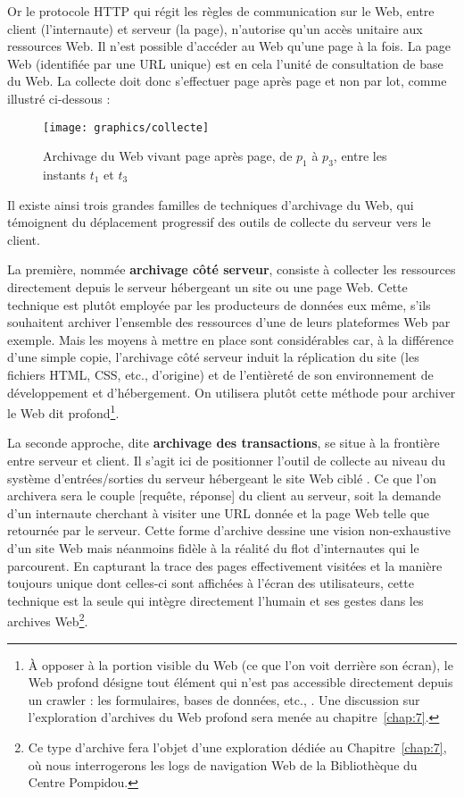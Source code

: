 \documentclass[symmetric,justified,marginals=raggedouter]{tufte-book}
\begin{document}
Or le protocole HTTP qui régit les règles de communication sur le Web, entre client (l'internaute) et serveur (la page), n'autorise qu'un accès unitaire aux ressources Web. Il n'est possible d'accéder au Web qu'une page à la fois. La page Web (identifiée par une URL unique) est en cela l'unité de consultation de base du Web. La collecte doit donc s'effectuer page après page et non par lot, comme illustré ci-dessous :   

\begin{figure*}%
  \texttt{[image: graphics/collecte]}
  \caption{Archivage du Web vivant page après page, de $p_1$ à $p_3$, entre les instants $t_1$ et $t_3$}
  \label{fig:collecte}
\end{figure*} 

\noindent Il existe ainsi trois grandes familles de techniques d'archivage du Web, qui témoignent du déplacement progressif des outils de collecte du serveur vers le client. 

La première, nommée \textbf{archivage côté serveur}, consiste à collecter les ressources directement depuis le serveur hébergeant un site ou une page Web. Cette technique est plutôt employée par les producteurs de données eux même, s'ils souhaitent archiver l'ensemble des ressources d'une de leurs plateformes Web par exemple. Mais les moyens à mettre en place sont considérables car, à la différence d'une simple copie, l'archivage côté serveur induit la réplication du site (les fichiers HTML, CSS, etc., d'origine) et de l'entièreté de son environnement de dévelop\-pement et d'hébergement. On utilisera plutôt cette méthode pour archiver le Web dit profond\footnote{\RaggedOuter À opposer à la portion visible du Web (ce que l'on voit derrière son écran), le Web profond désigne tout élément qui n'est pas accessible directement depuis un crawler : les formulaires, bases de données, etc., \citep{lawrence_accessibility_2000}. Une discussion sur l'exploration d'archives du Web profond sera menée au chapitre~\ref{chap:7}.}.

La seconde approche, dite \textbf{archivage des transactions}, se situe à la frontière entre serveur et client. Il s'agit ici de positionner l'outil de collecte au niveau du système d'entrées/sorties du serveur hébergeant le site Web ciblé \citep{fitch_web_2003}. Ce que l'on archivera sera le couple [requête, réponse] du client au serveur, soit la demande d'un internaute cherchant à visiter une URL donnée et la page Web telle que retournée par le serveur. Cette forme d'archive dessine une vision non-exhaustive d'un site Web mais néanmoins fidèle à la réalité du flot d'internautes qui le parcourent. En capturant la trace des pages effectivement visitées et la manière toujours unique dont celles-ci sont affichées à l'écran des utilisateurs, cette technique est la seule qui intègre directement l'humain et ses gestes dans les archives Web\footnote{\RaggedOuter Ce type d'archive fera l'objet d'une exploration dédiée au Chapitre~\ref{chap:7}, où nous interrogerons les logs de navigation Web de la Bibliothèque du Centre Pompidou.}.  
\end{document}
